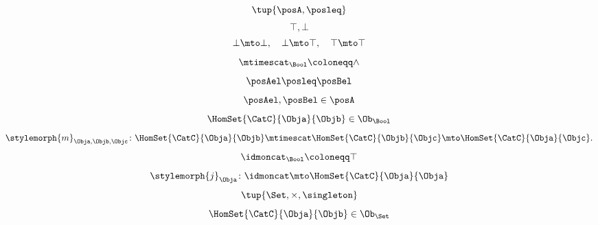 {\begin{forslides}
\begin{equation*}
            \tup{\posA,\posleq}
        \end{equation*}
        \begin{equation*}
            \label{eq:poset_bool_b}
            \top,\bot
        \end{equation*}
        \begin{equation*}
            \label{eq:poset_bool_c}
            \bot\mto \bot, \quad \bot\mto \top, \quad \top\mto \top
        \end{equation*}
        \begin{equation*}
            \label{eq:poset_bool_d}
            \mtimescat_\Bool \coloneqq \wedge
        \end{equation*}
        \begin{equation*}
            \label{eq:poset_bool_e}
            \posAel\posleq \posBel
        \end{equation*}
        \begin{equation*}
            \label{eq:poset_bool_f}
            \posAel,\posBel \in \posA
        \end{equation*}
        \begin{equation*}
            \label{eq:poset_bool_g}
            \HomSet{\CatC}{\Obja}{\Objb}\in \Ob_\Bool
        \end{equation*}
        \begin{equation*}
            \label{eq:poset_bool_h}
            \stylemorph{m}_{\Obja,\Objb,\Objc}\colon \HomSet{\CatC}{\Obja}{\Objb}\mtimescat \HomSet{\CatC}{\Objb}{\Objc}\mto \HomSet{\CatC}{\Obja}{\Objc}.
        \end{equation*}
        \begin{equation*}
            \label{eq:poset_bool_i}
            \idmoncat_\Bool \coloneqq \top
        \end{equation*}
        \begin{equation*}
            \label{eq:poset_bool_k}
            \stylemorph{j}_\Obja\colon \idmoncat \mto \HomSet{\CatC}{\Obja}{\Obja}
        \end{equation*}
        \begin{equation*}
            \label{eq:poset_bool_j}
            \tup{\Set, \times, \singleton}
        \end{equation*}
        \begin{equation*}
            \label{eq:poset_bool_l}
            \HomSet{\CatC}{\Obja}{\Objb}\in \Ob_\Set
        \end{equation*}
        \begin{equation*}

\end{equation*}
\end{forslides}}
